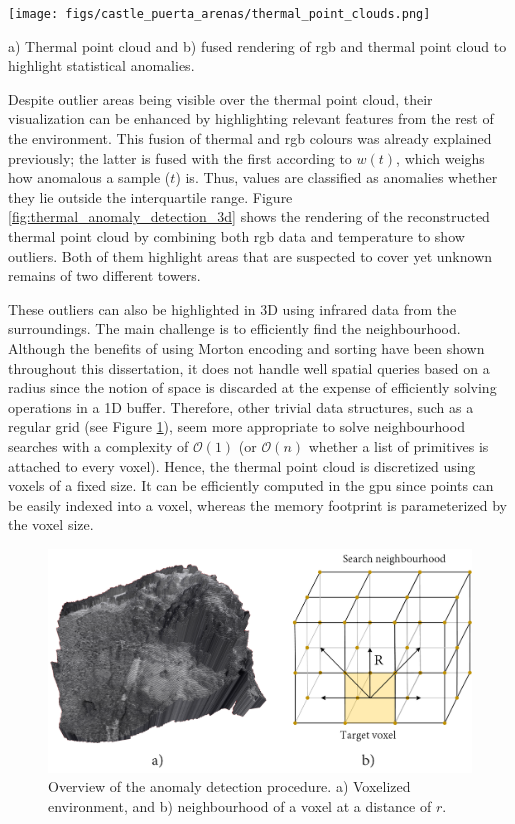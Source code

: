 \begin{marginfigure}[.2cm]
    \centering
    \texttt{[image: figs/castle\_puerta\_arenas/thermal\_point\_clouds.png]}
	\caption{a) Thermal point cloud and b) fused rendering of \acrshort{rgb} and thermal point cloud to highlight statistical anomalies.}
	\label{fig:thermal_anomaly_detection_3d}
\end{marginfigure}
Despite outlier areas being visible over the thermal point cloud, their visualization can be enhanced by highlighting relevant features from the rest of the environment. This fusion of thermal and \acrshort{rgb} colours was already explained previously; the latter is fused with the first according to $w(t)$, which weighs how anomalous a sample ($t$) is. Thus, values are classified as anomalies whether they lie outside the interquartile range. Figure \ref{fig:thermal_anomaly_detection_3d} shows the rendering of the reconstructed thermal point cloud by combining both \acrshort{rgb} data and temperature to show outliers. Both of them highlight areas that are suspected to cover yet unknown remains of two different towers. 

These outliers can also be highlighted in 3D using infrared data from the surroundings. The main challenge is to efficiently find the neighbourhood. Although the benefits of using Morton encoding and sorting have been shown throughout this dissertation, it does not handle well spatial queries based on a radius since the notion of space is discarded at the expense of efficiently solving operations in a 1D buffer. Therefore, other trivial data structures, such as a regular grid (see Figure \ref{fig:voxel_anomalies_scheme}), seem more appropriate to solve neighbourhood searches with a complexity of $\mathcal{O}(1)$ (or $\mathcal{O}(n)$ whether a list of primitives is attached to every voxel). Hence, the thermal point cloud is discretized using voxels of a fixed size. It can be efficiently computed in the \acrshort{gpu} since points can be easily indexed into a voxel, whereas the memory footprint is parameterized by the voxel size.

\begin{figure}[ht]
    \centering
    \includegraphics[width=\linewidth]{figs/castle_puerta_arenas/voxel_anomalies.png}
	\caption{Overview of the anomaly detection procedure. a) Voxelized environment, and b) neighbourhood of a voxel at a distance of $r$.}
	\label{fig:voxel_anomalies_scheme}
\end{figure}

